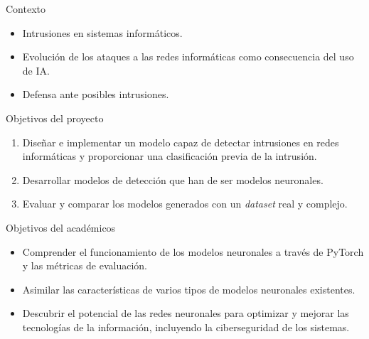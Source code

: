 
\begin{frame}{Contexto}
    \begin{itemize}
    		\item Intrusiones en sistemas informáticos.
        \vspace{10mm}
        \item Evolución de los ataques a las redes informáticas como consecuencia del uso de IA.
        \vspace{10mm}
        \item Defensa ante posibles intrusiones.
    \end{itemize}
\end{frame}


\begin{frame}{Objetivos del proyecto}
    \begin{enumerate}
        \item  Diseñar e implementar un modelo capaz de detectar intrusiones en redes informáticas y proporcionar una clasificación previa de la intrusión.
        \vspace{10mm}
        \item Desarrollar modelos de detección que han de ser modelos neuronales.
        \vspace{10mm}
        \item Evaluar y comparar los modelos generados con un \textit{dataset} real y complejo.
    \end{enumerate}
\end{frame}

\begin{frame}{Objetivos del académicos}
    \begin{itemize}
        \item Comprender el funcionamiento de los modelos neuronales a través de PyTorch y las métricas de evaluación.
        \vspace{10mm}
        \item Asimilar las características de varios tipos de modelos neuronales existentes.
        \vspace{10mm}
        \item Descubrir el potencial de las redes neuronales para optimizar y mejorar las tecnologías de la información, incluyendo la ciberseguridad de los sistemas.
        \end{itemize}
\end{frame}